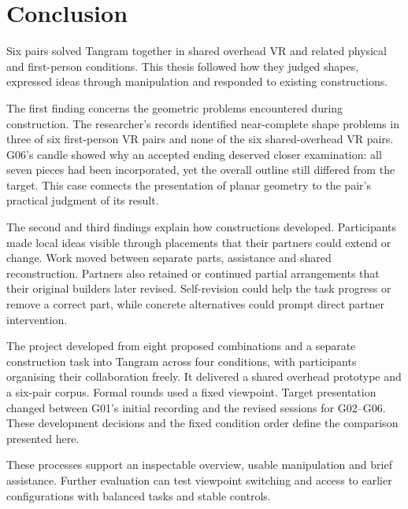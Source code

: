 \chapter{Conclusion}\label{chap:7}

Six pairs solved Tangram together in shared overhead VR and related physical and first-person conditions. This thesis followed how they judged shapes, expressed ideas through manipulation and responded to existing constructions.

The first finding concerns the geometric problems encountered during construction. The researcher's records identified near-complete shape problems in three of six first-person VR pairs and none of the six shared-overhead VR pairs. G06's candle showed why an accepted ending deserved closer examination: all seven pieces had been incorporated, yet the overall outline still differed from the target. This case connects the presentation of planar geometry to the pair's practical judgment of its result.

The second and third findings explain how constructions developed. Participants made local ideas visible through placements that their partners could extend or change. Work moved between separate parts, assistance and shared reconstruction. Partners also retained or continued partial arrangements that their original builders later revised. Self-revision could help the task progress or remove a correct part, while concrete alternatives could prompt direct partner intervention.

The project developed from eight proposed combinations and a separate construction task into Tangram across four conditions, with participants organising their collaboration freely. It delivered a shared overhead prototype and a six-pair corpus. Formal rounds used a fixed viewpoint. Target presentation changed between G01's initial recording and the revised sessions for G02--G06. These development decisions and the fixed condition order define the comparison presented here.

These processes support an inspectable overview, usable manipulation and brief assistance. Further evaluation can test viewpoint switching and access to earlier configurations with balanced tasks and stable controls.

